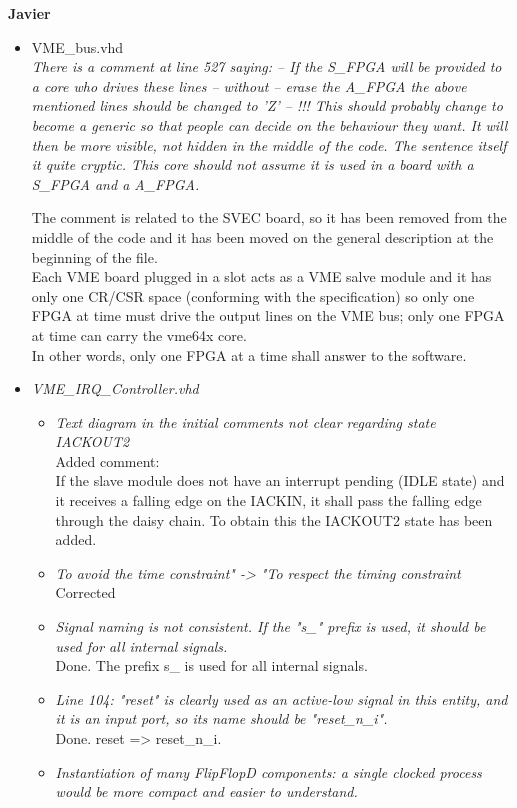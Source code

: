 \documentclass[a4paper,11pt]{article}
\begin{document}
\newpage
\begin{center}
\LARGE{\textbf{Javier}}
\end{center}
\begin{itemize}
\item VME\_bus.vhd\\
\textit{
There is a comment at line 527 saying:
-- If the S\_FPGA will be provided to a core who drives these lines
-- without
-- erase the A\_FPGA the above mentioned lines should be changed to 'Z'
-- !!!
This should probably change to become a generic so that people can
decide on the behaviour they want. It will then be more visible, not
hidden in the middle of the code. The sentence itself it quite
cryptic. This core should not assume it is used in a board with a
S\_FPGA and a A\_FPGA.}

The comment is related to the SVEC board, so it has been removed from the middle
of the code and 
it has been moved on the general description at the beginning of the file.\\

Each VME board plugged in a slot acts as a VME salve module and it has only one 
CR/CSR space (conforming with the specification) so only one FPGA at time 
must drive the output lines on the VME bus; only one FPGA at time can carry the 
vme64x core.\\
In other words, only one FPGA at a time shall answer to the software.\\

\item \textit{VME\_IRQ\_Controller.vhd}
\begin{itemize}
\item \textit{Text diagram in the initial comments not clear regarding state
IACKOUT2}\\
Added comment: \\
If the slave module does not have an interrupt pending (IDLE state) and it 
receives a falling edge on the IACKIN, it shall pass the falling edge through the
daisy chain. To obtain this the IACKOUT2 state has been added.
\item \textit{To avoid the time constraint" -> "To respect the timing
constraint}\\
Corrected
\item \textit{Signal naming is not consistent. If the "s\_" prefix is used, it 
should be used for all internal signals.}\\

Done. The prefix s\_ is used for all internal signals.
\item \textit{Line 104: "reset" is clearly used as an active-low signal in this
entity, and it is an input port, so its name should be "reset\_n\_i".}\\
Done. reset => reset\_n\_i.
\item \textit{Instantiation of many FlipFlopD components: a single clocked 
process would be more compact and easier to understand.}\\


\end{itemize}
\end{itemize}
\end{document}
